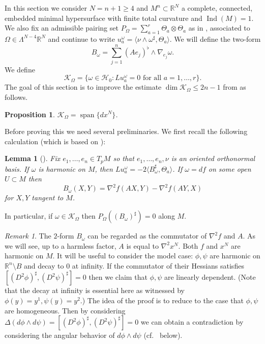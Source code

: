 \documentclass[11pt]{amsart}
\numberwithin{equation}{section}
\theoremstyle{plain}
\newtheorem{proposition}[proposition]{Proposition}
\newtheorem{lemma}[lemma]{Lemma}
\theoremstyle{definition}
\theoremstyle{remark}
\newtheorem{remark}[remark]{Remark}
\newcommand{\R}{\mathbb{R}}
\DeclareMathOperator{\Ind}{Ind}
\newcommand{\Hcal}{\mathcal H}
\newcommand{\Kcal}{\mathcal K}
\DeclareMathOperator{\Span}{span}
\newcommand{\bangle}[1]{\langle #1 \rangle}
\begin{document}
In this section we consider $N = n+1\geq 4$ and $M^n\subset \R^N$ a complete, connected, embedded minimal hypersurface with finite total curvature and $\Ind(M) = 1$. We also fix an admissible pairing set $P_\Omega = \sum_{a=1}^r \Theta_a \otimes \Theta_a$ as in , associated to $\Omega \in \Lambda^{N-4}\R^N$ and continue to write $u^\omega_a = \bangle{\nu \wedge \omega^\sharp ,\Theta_a}$. We will 
define the two-form
\begin{equation}\label{eq:defn-B}
B_\omega = \sum_{j=1}^n (Ae_j)^\flat \wedge \nabla_{e_j} \omega . 
\end{equation}
We define 
\[
\Kcal_\Omega = \{\omega \in \Hcal_0 : Lu^\omega_a = 0 \textrm{ for all }a = 1,\dots,r\}.
\] 
The goal of this section is to improve the estimate $\dim\Kcal_\Omega \leq 2n-1$ from \cite[\S 5]{Li2017} as follows. 
\begin{proposition}\label{prop:K-Omega}
$ \Kcal_\Omega = \Span\{dx^N\}$.
\end{proposition}
Before proving this we need several preliminaries. We first recall the following calculation (which is based on \cite[Lemma 2.4]{Savo2010}):
\begin{lemma}[{\cite[(4.1) and Remark 4.5]{Li2017}}]\label{lemm:rhs-L-u}
Fix $e_1,\dots,e_n\in T_p M$ so that $e_1,\dots,e_n,\nu$ is an oriented orthonormal basis. If $\omega$ is harmonic on $M$, then $L u^\omega_a =  - 2 \bangle{B_\omega^\sharp,\Theta_a}$. 
If $\omega = df$ on some open $U\subset M$ then 
\[
B_\omega(X,Y) = \nabla^2 f(AX,Y) - \nabla^2 f(AY,X)
\]
for $X,Y$ tangent to $M$.  
\end{lemma}
In particular, if $\omega \in \Kcal_\Omega$ then $P_\Omega ((B_\omega)^\sharp) = 0$ along $M$. 

\begin{remark}
The $2$-form $B_\omega$ can be regarded as the commutator of $\nabla^2f$ and $A$. As we will see, up to a harmless factor, $A$ is  equal to $\nabla^2 x^N$. Both $f$ and $x^N$ are harmonic on $M$. It will be useful to consider the model case: $\phi,\psi$ are harmonic on $\R^n \setminus B$ and decay to $0$ at infinity. If the commutator of their Hessians satisfies $[(D^2\phi)^\sharp,(D^2\psi)^\sharp]=0$ then we claim that $\phi,\psi$ are linearly dependent. (Note that the decay at infinity is essential here as witnessed by $\phi(y)=y^1,\psi(y)=y^2$.) The idea of the proof is to reduce to the case that $\phi,\psi$ are homogeneous. Then by considering $\Delta (d\phi \wedge d\psi) = [(D^2\phi)^\sharp,(D^2\psi)^\sharp]=0$ we can obtain a contradiction by considering the angular behavior of $d\phi \wedge d\psi$ (cf.\  below). 
\end{remark}
\end{document}
